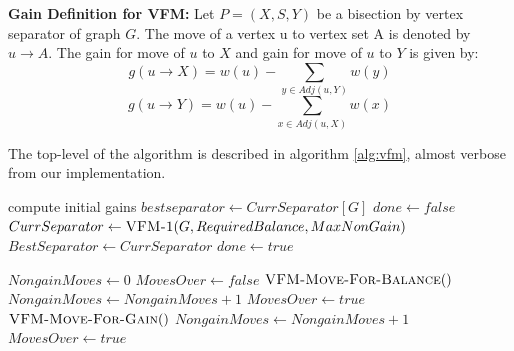 \documentclass[a4paper,12pt]{article}
\begin{document}
\begin{dfn}
\textbf{Gain Definition for VFM:} Let $P=(X,S,Y)$ be a bisection by
vertex separator of graph $G$. The move of a vertex u to vertex set A is
denoted by $u\rightarrow A$. The gain for move of $u$ to $X$ and gain
for move of $u$ to $Y$ is given
by:
\begin{equation}
	g(u\rightarrow X) = w(u) - \sum_{y \in Adj(u,Y)}{w(y)}
\end{equation}
\begin{equation}
	g(u\rightarrow Y) = w(u) - \sum_{x \in Adj(u,X)}{w(x)}
\end{equation}
\end{dfn}

The top-level of the algorithm is described in algorithm
\ref{alg:vfm}, almost verbose from our implementation.

\begin{algorithm}
\caption{$\textsc{VFM-Refinement}(G,RequiredBalance,MaxNonGain)$} \begin{algorithmic}[1]
\label{alg:vfm}
\STATE compute initial gains
\STATE $bestseparator \gets CurrSeparator[G]$
\STATE $done \gets false$
\STATE $CurrSeparator \gets \textsc{VFM-1}(G,RequiredBalance,
MaxNonGain)$
\STATE $BestSeparator \gets CurrSeparator $
\ELSE
\STATE $done \gets true$
\ENDIF
\ENDWHILE
\end{algorithmic}\end{algorithm}

\begin{algorithm}
\caption{$\textsc{VFM-1}(G,RequiredBalance,MaxNonGain)$} \begin{algorithmic}[1]
\label{alg:vfm-1}
\STATE $NongainMoves \gets 0$
\STATE $MovesOver \gets false$
\STATE $\textsc{VFM-Move-For-Balance}()$
\STATE $NongainMoves \gets NongainMoves + 1$
\ENDIF
{}
\STATE $MovesOver \gets true$
\ENDIF
\ENDWHILE
{}
\STATE $\textsc{VFM-Move-For-Gain}()$
\STATE $NongainMoves \gets NongainMoves + 1$
\ENDIF
{}
\STATE $MovesOver \gets true$
\ENDIF
\ENDWHILE
\end{algorithmic}\end{algorithm}
\end{document}
